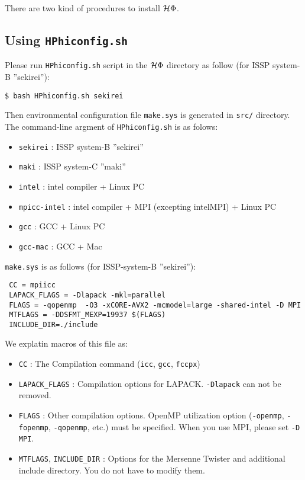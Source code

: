 There are two kind of procedures to install $\mathcal{H} \Phi$.

\subsection{Using \texttt{HPhiconfig.sh}}

Please run \verb|HPhiconfig.sh| script in the $\mathcal{H} \Phi$ directory as follow
(for ISSP system-B ''sekirei''):
\begin{verbatim}
$ bash HPhiconfig.sh sekirei
\end{verbatim}
Then environmental configuration file \verb|make.sys| is generated in 
\verb|src/| directory.
The command-line argment of \verb|HPhiconfig.sh| is as folows:
\begin{itemize}
\item \verb|sekirei| : ISSP system-B ''sekirei''
\item \verb|maki| : ISSP system-C ''maki''
\item \verb|intel| : intel compiler + Linux PC
\item \verb|mpicc-intel| : intel compiler + MPI (excepting intelMPI) + Linux PC
\item \verb|gcc| : GCC + Linux PC
\item \verb|gcc-mac| : GCC + Mac
\end{itemize}

\verb|make.sys| is as follows (for ISSP-system-B ''sekirei''):
\begin{verbatim}
 CC = mpiicc
 LAPACK_FLAGS = -Dlapack -mkl=parallel 
 FLAGS = -qopenmp  -O3 -xCORE-AVX2 -mcmodel=large -shared-intel -D MPI
 MTFLAGS = -DDSFMT_MEXP=19937 $(FLAGS)
 INCLUDE_DIR=./include
\end{verbatim}
We explatin macros of this file as: 
\begin{itemize}
\item \verb|CC| : The Compilation command (\verb|icc|, \verb|gcc|, \verb|fccpx|)
\item \verb|LAPACK_FLAGS| : Compilation options for LAPACK. \verb|-Dlapack| can not be removed.
\item \verb|FLAGS| : Other compilation options.
  OpenMP utilization option (\verb|-openmp|, \verb|-fopenmp|, \verb|-qopenmp|, etc.)
  must be specified.
  When you use MPI, please set \verb|-D MPI|.
\item \verb|MTFLAGS|, \verb|INCLUDE_DIR| : Options for the Mersenne Twister
  and additional include directory. You do not have to modify them.
\end{itemize}


